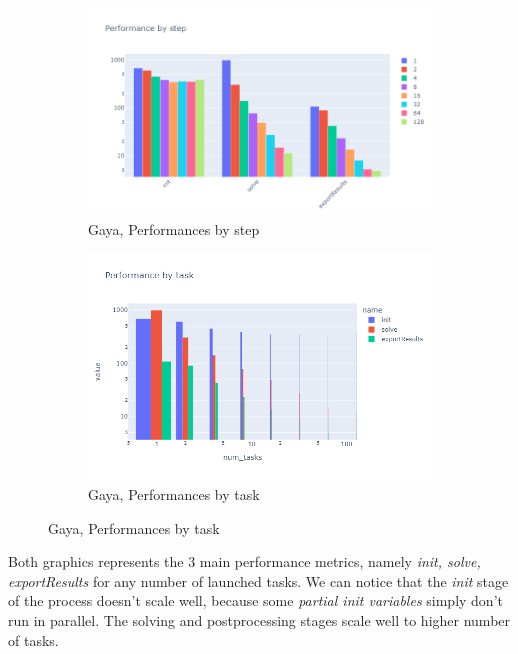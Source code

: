 \documentclass[12pt]{article}
\begin{document}
\begin{figure}[h]
    \centering
    \begin{subfigure}[b]{0.45\textwidth}
        \centering
        \includegraphics[width=\textwidth]{../illustrations/gaya-graphs/gayaByStep.png}
        \caption{Gaya, Performances by step}
    \end{subfigure}
    \hfill
    \begin{subfigure}[b]{0.45\textwidth}
        \centering
        \includegraphics[width=\textwidth]{../illustrations/gaya-graphs/gayaByTask.png}
        \caption{Gaya, Performances by task}
    \end{subfigure}
\end{figure}

Both graphics represents the 3 main performance metrics, namely \textit{init, solve, exportResults} for any number of launched tasks.
We can notice that the \textit{init} stage of the process doesn't scale well, because some \textit{partial init variables} simply don't run in  parallel.
The solving and postprocessing stages scale well to higher number of tasks.
\end{document}
